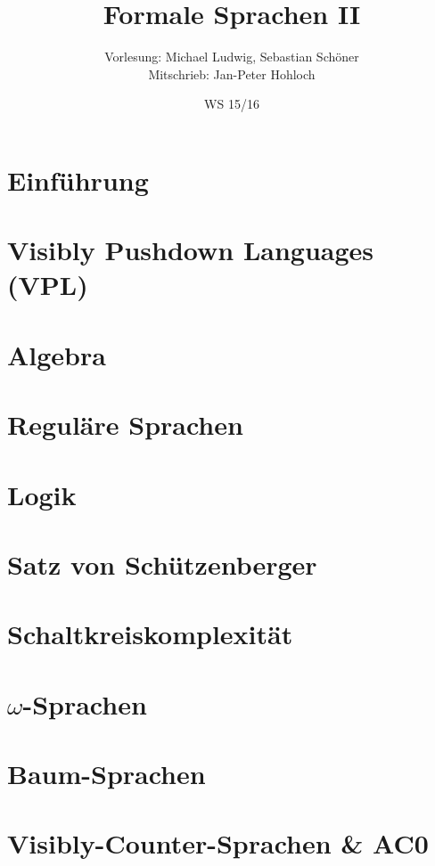 \documentclass[german,a4paper,10pt]{scrreprt}
\title{Formale Sprachen II}
\author{Vorlesung: Michael Ludwig, Sebastian Schöner\\
Mitschrieb: Jan-Peter Hohloch}
\date{WS 15/16}
\begin{document}
    \maketitle
    \tableofcontents
    \newpage
    \chapter{Einführung}
        
    \chapter{Visibly Pushdown Languages (VPL)}
        
    \chapter{Algebra}
        
    \chapter{Reguläre Sprachen}
        
    \chapter{Logik}
        
    \chapter{Satz von Schützenberger}
        
    \chapter{Schaltkreiskomplexität}
        
    \chapter{$\omega$-Sprachen}
        
    \chapter{Baum-Sprachen}
        
	 \chapter{Visibly-Counter-Sprachen \& AC0}
        
\end{document}
